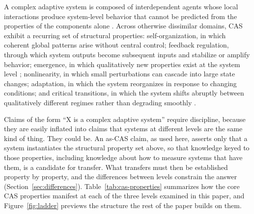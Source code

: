 \documentclass[12pt, letterpaper]{article}
\begin{document}
A complex adaptive system is composed of interdependent agents whose local interactions produce system-level behavior that cannot be predicted from the properties of the components alone \parencite{holland1995}. Across otherwise dissimilar domains, CAS exhibit a recurring set of structural properties: self-organization, in which coherent global patterns arise without central control; feedback regulation, through which system outputs become subsequent inputs and stabilize or amplify behavior; emergence, in which qualitatively new properties exist at the system level \parencite{goldstein1999}; nonlinearity, in which small perturbations can cascade into large state changes; adaptation, in which the system reorganizes in response to changing conditions; and critical transitions, in which the system shifts abruptly between qualitatively different regimes rather than degrading smoothly \parencite{anderson1999,scheffer2009}.

Claims of the form ``X is a complex adaptive system'' require discipline, because they are easily inflated into claims that systems at different levels are the same kind of thing. They could be. An as-CAS claim, as used here, asserts only that a system instantiates the structural property set above, so that knowledge keyed to those properties, including knowledge about how to measure systems that have them, is a candidate for transfer. What transfers must then be established property by property, and the differences between levels constrain the answer (Section~\ref{sec:differences}). Table~\ref{tab:cas-properties} summarizes how the core CAS properties manifest at each of the three levels examined in this paper, and Figure~\ref{fig:ladder} previews the structure the rest of the paper builds on them.
\end{document}

